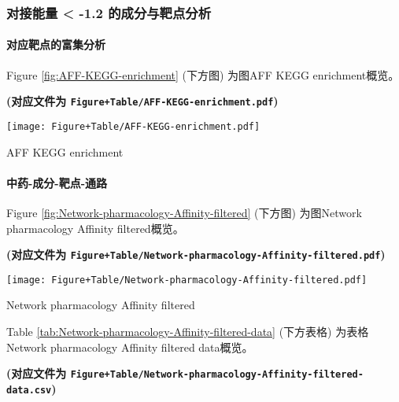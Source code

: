 \documentclass[
]{article}
\begin{document}
\hypertarget{ux5bf9ux63a5ux80fdux91cf--1.2-ux7684ux6210ux5206ux4e0eux9776ux70b9ux5206ux6790}{%
\subsubsection{对接能量 \textless{} -1.2 的成分与靶点分析}\label{ux5bf9ux63a5ux80fdux91cf--1.2-ux7684ux6210ux5206ux4e0eux9776ux70b9ux5206ux6790}}

\hypertarget{ux5bf9ux5e94ux9776ux70b9ux7684ux5bccux96c6ux5206ux6790}{%
\paragraph{对应靶点的富集分析}\label{ux5bf9ux5e94ux9776ux70b9ux7684ux5bccux96c6ux5206ux6790}}

Figure \ref{fig:AFF-KEGG-enrichment} (下方图) 为图AFF KEGG enrichment概览。

\textbf{(对应文件为 \texttt{Figure+Table/AFF-KEGG-enrichment.pdf})}

\def\@captype{figure}
\begin{center}
\texttt{[image: Figure+Table/AFF-KEGG-enrichment.pdf]}
\caption{AFF KEGG enrichment}\label{fig:AFF-KEGG-enrichment}
\end{center}

\hypertarget{ux4e2dux836f-ux6210ux5206-ux9776ux70b9-ux901aux8def}{%
\paragraph{中药-成分-靶点-通路}\label{ux4e2dux836f-ux6210ux5206-ux9776ux70b9-ux901aux8def}}

Figure \ref{fig:Network-pharmacology-Affinity-filtered} (下方图) 为图Network pharmacology Affinity filtered概览。

\textbf{(对应文件为 \texttt{Figure+Table/Network-pharmacology-Affinity-filtered.pdf})}

\def\@captype{figure}
\begin{center}
\texttt{[image: Figure+Table/Network-pharmacology-Affinity-filtered.pdf]}
\caption{Network pharmacology Affinity filtered}\label{fig:Network-pharmacology-Affinity-filtered}
\end{center}

Table \ref{tab:Network-pharmacology-Affinity-filtered-data} (下方表格) 为表格Network pharmacology Affinity filtered data概览。

\textbf{(对应文件为 \texttt{Figure+Table/Network-pharmacology-Affinity-filtered-data.csv})}
\end{document}
